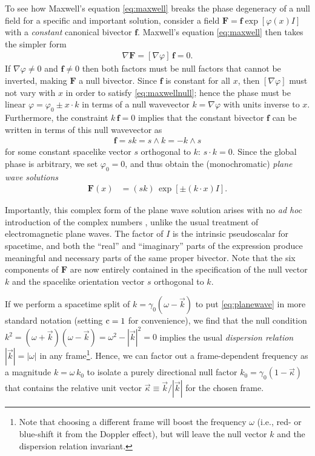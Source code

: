 \documentclass[1p,sort&compress]{elsarticle}
\numberwithin{equation}{section}
\newcommand{\rv}[1]{\vec{#1}}
\newcommand{\bv}[1]{\mathbf{#1}}
\newcommand{\cc}{{\rm c}}
\begin{document}
To see how Maxwell's equation \eqref{eq:maxwell} breaks the phase degeneracy of a null field for a specific and important solution, consider a field $\bv{F} = \bv{f} \exp[\varphi(x) I]$ with a \emph{constant} canonical bivector $\bv{f}$.  Maxwell's equation \eqref{eq:maxwell} then takes the simpler form
\begin{align}\label{eq:maxwellnull}
  \nabla \bv{F} = [\nabla\varphi]\,\bv{f} = 0.
\end{align}
If $\nabla\varphi \neq 0$ and $\bv{f}\neq 0$ then both factors must be null factors that cannot be inverted, making $\bv{F}$ a null bivector.  Since $\bv{f}$ is constant for all $x$, then $[\nabla\varphi]$ must not vary with $x$ in order to satisfy \eqref{eq:maxwellnull}; hence the phase must be linear $\varphi = \varphi_0 \pm x\cdot k$ in terms of a null wavevector $k = \nabla\varphi$ with units inverse to $x$.  Furthermore, the constraint $k\, \bv{f} = 0$ implies that the constant bivector $\bv{f}$ can be written in terms of this null wavevector as 
\begin{align}
  \bv{f} = sk = s\wedge k = -k\wedge s
\end{align}
for some constant spacelike vector $s$ orthogonal to $k$: $s\cdot k = 0$.  Since the global phase is arbitrary, we set $\varphi_0 = 0$, and thus obtain the (monochromatic) \emph{plane wave solutions}
\begin{align}\label{eq:planewave}
  \bv{F}(x) &= (sk)\, \exp[\pm(k\cdot x) I].
\end{align}

Importantly, this complex form of the plane wave solution arises with no \emph{ad hoc} introduction of the complex numbers \cite{Hestenes1971}, unlike the usual treatment of electromagnetic plane waves.  The factor of $I$ is the intrinsic pseudoscalar for spacetime, and both the ``real'' and ``imaginary'' parts of the expression produce meaningful and necessary parts of the same proper bivector.  Note that the six components of $\bv{F}$ are now entirely contained in the specification of the null vector $k$ and the spacelike orientation vector $s$ orthogonal to $k$.

If we perform a spacetime split of $k = \gamma_0(\omega - \rv{k})$ to put \eqref{eq:planewave} in more standard notation (setting $\cc=1$ for convenience), we find that the null condition $k^2 = (\omega + \rv{k})(\omega - \rv{k}) = \omega^2 - |\rv{k}|^2 = 0$ implies the usual \emph{dispersion relation} $|\rv{k}| = |\omega|$ in any frame\footnote{Note that choosing a different frame will boost the frequency $\omega$ (i.e., red- or blue-shift it from the Doppler effect), but will leave the null vector $k$ and the dispersion relation invariant.}.  Hence, we can factor out a frame-dependent frequency as a magnitude $k = \omega\, k_0$ to isolate a purely directional null factor $k_0 = \gamma_0(1 - \rv{\kappa})$ that contains the relative unit vector $\rv{\kappa} \equiv \rv{k}/|\rv{k}|$ for the chosen frame.  
\end{document}
